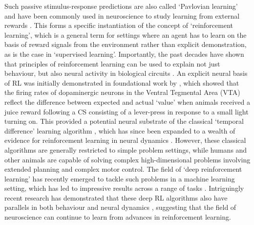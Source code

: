 Such passive stimulus-response predictions are also called `Pavlovian learning' and have been commonly used in neuroscience to study learning from external rewards \citep{niv2009reinforcement}.
This forms a specific instantiation of the concept of `reinforcement learning', which is a general term for settings where an agent has to learn on the basis of reward signals from the environment rather than explicit demonstration, as is the case in `supervised learning'.
Importantly, the past decades have shown that principles of reinforcement learning can be used to explain not just behaviour, but also neural activity in biological circuits \citep{niv2009reinforcement}.
An explicit neural basis of RL was initially demonstrated in foundational work by \citet{schultz1997neural}, which showed that the firing rates of dopaminergic neurons in the Ventral Tegmental Area (VTA) reflect the difference between expected and actual `value' when animals received a juice reward following a CS consisting of a lever-press in response to a small light turning on.
This provided a potential neural substrate of the classical `temporal difference' learning algorithm \citep{schultz1997neural}, which has since been expanded to a wealth of evidence for reinforcement learning in neural dynamics \citep{niv2009reinforcement, dabney2020distributional}.
However, these classical algorithms are generally restricted to simple problem settings, while humans and other animals are capable of solving complex high-dimensional problems involving extended planning and complex motor control.
The field of `deep reinforcement learning' has recently emerged to tackle such problems in a machine learning setting, which has led to impressive results across a range of tasks \citep{mnih2013playing, schrittwieser2020mastering, wurman2022outracing, vinyals2019grandmaster}.
Intriguingly recent research has demonstrated that these deep RL algorithms also have parallels in both behaviour and neural dynamics \citep{botvinick2020deep, wang2018prefrontal, dabney2020distributional, jensen2023recurrent}, suggesting that the field of neuroscience can continue to learn from advances in reinforcement learning.

